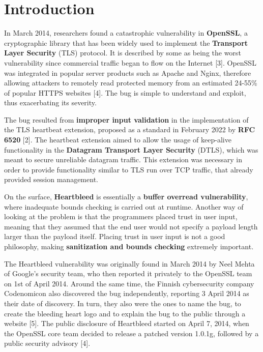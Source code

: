 \documentclass[12pt,a4paper,english,onecolumn]{IEEEtran}
\begin{document}
\section{Introduction}

In March 2014, researchers found a catastrophic vulnerability in \textbf{OpenSSL}, a cryptographic library that has been widely used to implement the \textbf{Transport Layer Security} (TLS) protocol. It is described by some as being the worst vulnerability since commercial traffic began to flow on the Internet [3]. OpenSSL was integrated in popular server products such as Apache and Nginx, therefore allowing attackers to remotely read protected memory from an estimated 24-55\% of popular HTTPS websites [4]. The bug is simple to understand and exploit, thus exacerbating its severity. \par
The bug resulted from \textbf{improper input validation} in the implementation of the TLS heartbeat extension, proposed as a standard in February 2022 by \textbf{RFC 6520} [2]. The heartbeat extension aimed to allow the usage of keep-alive functionality in the \textbf{Datagram Transport Layer Security} (DTLS), which was meant to secure unreliable datagram traffic. This extension was necessary in order to provide functionality similar to TLS run over TCP traffic, that already provided session management.\par
On the surface, \textbf{Heartbleed} is essentially a \textbf{buffer overread vulnerability}, where inadequate bounds checking is carried out at runtime. Another way of looking at the problem is that the programmers placed trust in user input, meaning that they assumed that the end user would not specify a payload length larger than the payload itself. Placing trust in user input is not a good philosophy, making \textbf{sanitization and bounds checking} extremely important. \par
The Heartbleed vulnerability was originally found in March 2014 by Neel Mehta of Google’s security team, who then reported it privately to the OpenSSL team on 1st of April 2014. Around the same time, the Finnish cybersecurity company Codenomicon also discovered the bug independently, reporting 3 April 2014 as their date of discovery. In turn, they also were the ones to name the bug, to create the bleeding heart logo and to explain the bug to the public through a website [5]. The public disclosure of Heartbleed started on April 7, 2014, when the OpenSSL core team decided to release a patched version 1.0.1g, followed by a public security advisory [4]. \par
\end{document}
